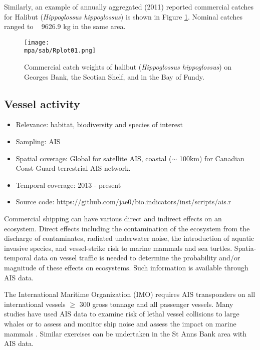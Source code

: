 \documentclass[letterpaper,portrait,11pt]{scrartcl}
\numberwithin{equation}{section}		%
\numberwithin{figure}{section}		%
\numberwithin{table}{section}				%
\newcommand*{\D}{.}
\newcommand{\biodata}{\string~/bio\D data}   %
\newcommand{\mpa}{\biodata/bio\D indicators/mpa}  %
\begin{document}
Similarly, an example of annually aggregated (2011) reported commercial catches for Halibut (\textit{Hippoglossus hippoglossus}) is shown in Figure \ref{fig:halibut}.  Nominal catches ranged to ~ 9626.9 kg in the same area.



\begin{figure}[h]
	\centering
	\texttt{[image: \\mpa/sab/Rplot01.png]}
	\caption{Commercial catch weights of halibut (\textit{Hippoglossus hippoglossus}) on Georges Bank, the Scotian Shelf, and in the Bay of Fundy.}
	\label{fig:halibut}
\end{figure}



\subsection{Vessel activity}

\begin{itemize}
	\item Relevance:  habitat, biodiversity and species of interest
	\item Sampling:  AIS
	\item Spatial coverage: Global for satellite AIS, coastal ($\sim$ 100km) for Canadian Coast Guard terrestrial AIS network.
	\item Temporal coverage: 2013 - present
	\item Source code: https://github.com/jae0/bio.indicators/inst/scripts/ais.r
\end{itemize}	


Commercial shipping can have various direct and indirect effects on an ecosystem. Direct effects including the contamination of the ecosystem from the discharge of contaminates, radiated underwater noise, the introduction of aquatic invasive species, and vessel-strike risk to marine mammals and sea turtles.  Spatia-temporal data on vessel traffic is needed to determine the probability and/or magnitude of these effects on ecosystems.  Such information is available through AIS data.  

The International Maritime Organization (IMO) requires AIS transponders on all international vessels $\geq$ 300 gross tonnage and all passenger vessels.  Many studies have used AIS data to examine risk of lethal vessel collisions to large whales \parencite[e.g.,][ ]{vanderlaan:2009:efficacy, wiley:2011:modeling, redfern2013assessing, guzman2013potential} or to assess and monitor ship noise and assess the impact on marine mammals \parencite{ hatch2008characterizing, mckenna2012underwater, hatch2012quantifying, merchant2014monitoring}. Similar exercises can be undertaken in the St Anns Bank area with AIS data.
\end{document}

